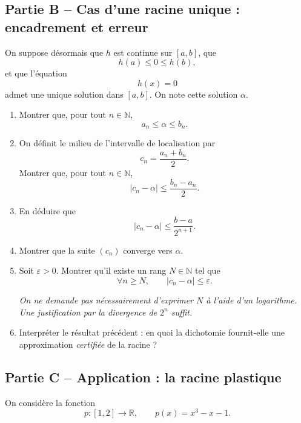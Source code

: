 \documentclass[11pt,a4paper]{article}
\newcommand{\R}{\mathbb{R}}
\newcommand{\N}{\mathbb{N}}
\begin{document}

\subsection*{Partie B -- Cas d'une racine unique : encadrement et erreur}

On suppose désormais que \(h\) est continue sur \([a,b]\), que
\[
h(a)\leq 0\leq h(b),
\]
et que l'équation
\[
h(x)=0
\]
admet une unique solution dans \([a,b]\). On note cette solution \(\alpha\).

\begin{enumerate}[resume]
    \item Montrer que, pour tout \(n\in\N\),
    \[
    a_n\leq \alpha\leq b_n.
    \]

    \item On définit le milieu de l'intervalle de localisation par
    \[
    c_n=\frac{a_n+b_n}{2}.
    \]
    Montrer que, pour tout \(n\in\N\),
    \[
    |c_n-\alpha|\leq \frac{b_n-a_n}{2}.
    \]

    \item En déduire que
    \[
    |c_n-\alpha|\leq \frac{b-a}{2^{n+1}}.
    \]

    \item Montrer que la suite \((c_n)\) converge vers \(\alpha\).

    \item Soit \(\varepsilon>0\). Montrer qu'il existe un rang \(N\in\N\) tel que
    \[
    \forall n\geq N,
    \qquad
    |c_n-\alpha|\leq \varepsilon.
    \]

    \medskip

    \emph{On ne demande pas nécessairement d'exprimer \(N\) à l'aide d'un logarithme. Une justification par la divergence de \(2^n\) suffit.}

    \item Interpréter le résultat précédent : en quoi la dichotomie fournit-elle une approximation \emph{certifiée} de la racine ?
\end{enumerate}


\subsection*{Partie C -- Application : la racine plastique}

On considère la fonction
\[
p : [1,2]\longrightarrow \R,
\qquad
p(x)=x^3-x-1.
\]
\end{document}
